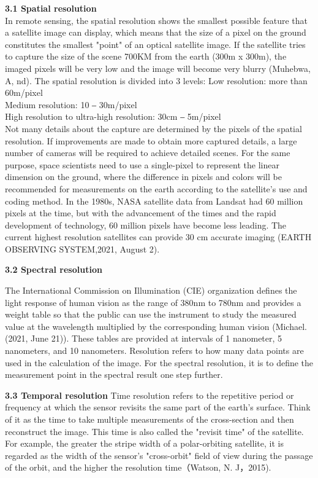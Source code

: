 \documentclass[conference]{IEEEtran}
\begin{document}
\small {\bf 3.1 Spatial resolution\rm} 
\\
In remote sensing, the spatial resolution shows the smallest possible feature that a satellite image can display, which means that the size of a pixel on the ground constitutes the smallest "point" of an optical satellite image. If the satellite tries to capture the size of the scene 700KM from the earth (300m x 300m), the imaged pixels will be very low and the image will become very blurry (Muhebwa, A, nd). The spatial resolution is divided into 3 levels:
Low resolution: more than 60m/pixel
\\
Medium resolution: 10 ‒ 30m/pixel
\\
High resolution to ultra-high resolution: 30cm ‒ 5m/pixel
\\
Not many details about the capture are determined by the pixels of the spatial resolution. If improvements are made to obtain more captured details, a large number of cameras will be required to achieve detailed scenes. For the same purpose, space scientists need to use a single-pixel to represent the linear dimension on the ground, where the difference in pixels and colors will be recommended for measurements on the earth according to the satellite's use and coding method. In the 1980s, NASA satellite data from Landsat had 60 million pixels at the time, but with the advancement of the times and the rapid development of technology, 60 million pixels have become less leading. The current highest resolution satellites can provide 30 cm accurate imaging (EARTH OBSERVING SYSTEM,2021, August 2). 

\small {\bf 3.2 Spectral resolution\rm} 

The International Commission on Illumination (CIE) organization defines the light response of human vision as the range of 380nm to 780nm and provides a weight table so that the public can use the instrument to study the measured value at the wavelength multiplied by the corresponding human vision (Michael. (2021, June 21)). These tables are provided at intervals of 1 nanometer, 5 nanometers, and 10 nanometers. Resolution refers to how many data points are used in the calculation of the image. For the spectral resolution, it is to define the measurement point in the spectral result one step further.


\small {\bf 3.3	Temporal resolution\rm} 
Time resolution refers to the repetitive period or frequency at which the sensor revisits the same part of the earth's surface. Think of it as the time to take multiple measurements of the cross-section and then reconstruct the image. This time is also called the "revisit time" of the satellite. For example, the greater the stripe width of a polar-orbiting satellite, it is regarded as the width of the sensor's "cross-orbit" field of view during the passage of the orbit, and the higher the resolution time（Watson, N. J，2015).
\end{document}

